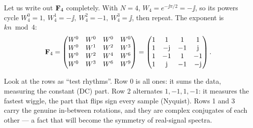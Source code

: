 Let us write out $\mathbf{F}_4$ completely. With $N=4$, $W_4 = e^{-\jj\pi/2} = -\jj$,
so its powers cycle $W_4^0 = 1,\ W_4^1 = -\jj,\ W_4^2 = -1,\ W_4^3 = \jj$, then
repeat. The exponent is $kn \bmod 4$:
\[
\mathbf{F}_4 =
\begin{pmatrix}
W^0 & W^0 & W^0 & W^0\\
W^0 & W^1 & W^2 & W^3\\
W^0 & W^2 & W^4 & W^6\\
W^0 & W^3 & W^6 & W^9
\end{pmatrix}
=
\begin{pmatrix}
1 & 1 & 1 & 1\\
1 & -\mathrm{j} & -1 & \mathrm{j}\\
1 & -1 & 1 & -1\\
1 & \mathrm{j} & -1 & -\mathrm{j}
\end{pmatrix}.
\]

\begin{intuitionbox}
Look at the rows as ``test rhythms''. Row 0 is all ones: it sums the data,
measuring the constant (DC) part. Row 2 alternates $1,-1,1,-1$: it measures the
fastest wiggle, the part that flips sign every sample (Nyquist). Rows 1 and 3
carry the genuine in-between rotations, and they are complex conjugates of each
other --- a fact that will become the symmetry of real-signal spectra.
\end{intuitionbox}

